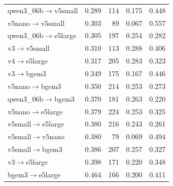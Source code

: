 \begin{tabular}{lrrrr}
qwen3\_06b$\to$v5small & 0.289 & 114 & 0.175 & 0.448 \\
v5nano$\to$v5small & 0.303 & 89 & 0.067 & 0.557 \\
qwen3\_06b$\to$e5large & 0.305 & 197 & 0.254 & 0.282 \\
v3$\to$v5small & 0.310 & 113 & 0.288 & 0.406 \\
v4$\to$e5large & 0.317 & 205 & 0.283 & 0.323 \\
v3$\to$bgem3 & 0.349 & 175 & 0.167 & 0.446 \\
v5nano$\to$bgem3 & 0.350 & 214 & 0.253 & 0.273 \\
qwen3\_06b$\to$bgem3 & 0.370 & 181 & 0.263 & 0.220 \\
v5nano$\to$e5large & 0.379 & 224 & 0.253 & 0.325 \\
v5small$\to$e5large & 0.380 & 216 & 0.243 & 0.261 \\
v5small$\to$v5nano & 0.380 & 79 & 0.069 & 0.494 \\
v5small$\to$bgem3 & 0.386 & 207 & 0.257 & 0.327 \\
v3$\to$e5large & 0.398 & 171 & 0.220 & 0.348 \\
bgem3$\to$e5large & 0.464 & 166 & 0.200 & 0.411 \\
\bottomrule
\end{tabular}